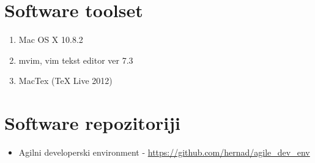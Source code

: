 \documentclass[lmodern, utf8, zavrsni]{fit}
\begin{document}
\chapter{Software toolset}
\begin{enumerate}
  \item Mac OS X 10.8.2
  \item mvim, vim tekst editor ver 7.3
  \item MacTex (TeX Live 2012)
\end{enumerate}

\chapter{Software repozitoriji}

\begin{itemize}
  \item Agilni developerski environment - \url{https://github.com/hernad/agile\_dev\_env}

\end{itemize}
\end{document}

